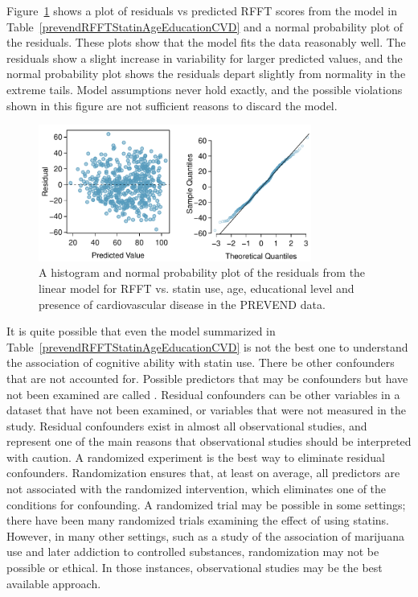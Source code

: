 Figure~\ref{prevendRFFTStatinAgeEducCVDResidNormPlot} shows a plot of residuals vs predicted RFFT scores from the model in Table~\ref{prevendRFFTStatinAgeEducationCVD} and a normal probability plot of the residuals. These plots show that the model fits the data reasonably well. The residuals show a slight increase in variability for larger predicted values, and the normal probability plot shows the residuals depart slightly from normality in the extreme tails.  Model assumptions never hold exactly, and the possible violations shown in this figure are not sufficient reasons to discard the model.

\begin{figure}[h!]
	\centering
	\includegraphics[width=0.8\textwidth]
	{ch_multiple_linear_regression_oi_biostat/figures/prevendRFFTStatinAgeEducCVDResidNormPlot/prevendRFFTStatinAgeEducCVDResidNormPlot.pdf}
	\caption{A histogram and normal probability plot of the residuals from the linear model for RFFT vs. statin use, age, educational level and presence of cardiovascular disease in the PREVEND data.}
	\label{prevendRFFTStatinAgeEducCVDResidNormPlot}
\end{figure}

It is quite possible that even the model summarized in Table~\ref{prevendRFFTStatinAgeEducationCVD} is not the best one to understand the association of cognitive ability with statin use. There be other confounders that are not accounted for.  Possible predictors that may be confounders but have not been examined are called .  Residual confounders can be other variables in a dataset that have not been examined, or variables that were not measured in the study.  Residual confounders exist in almost all observational studies, and represent one of the main reasons that observational studies should be interpreted with caution. A randomized experiment is the best way to eliminate residual confounders. Randomization ensures that, at least on average, all predictors are not associated with the randomized intervention, which eliminates one of the conditions for confounding.  A randomized trial may be possible in some settings; there have been many randomized trials examining the effect of using statins. However, in many other settings, such as a study of the association of marijuana use and later addiction to controlled substances, randomization may not be possible or ethical.  In those instances, observational studies may be the best available approach.

